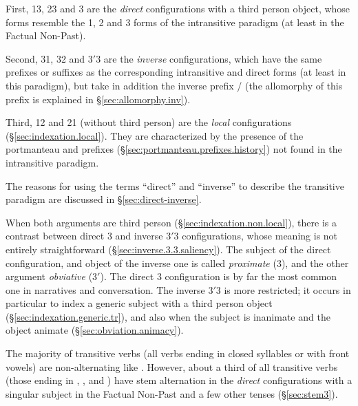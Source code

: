 First, 1\fl{}3, 2\fl{}3 and 3\flobv{} are the \textit{direct} configurations with a third person object, whose forms resemble the 1, 2 and 3 forms of the intransitive paradigm (at least in the Factual Non-Past). 

Second, 3\fl{}1, 3\fl{}2 and 3$'$\fl{}3 are the \textit{inverse} configurations, which have the same prefixes or suffixes as the corresponding intransitive and direct forms (at least in this paradigm), but take in addition the inverse prefix / (the allomorphy of this prefix is explained in §\ref{sec:allomorphy.inv}). 

Third, 1\fl{}2 and 2\fl{}1 (without third person) are the \textit{local} configurations (§\ref{sec:indexation.local}). They are characterized by the presence of the portmanteau  and  prefixes (§\ref{sec:portmanteau.prefixes.history}) not found in the intransitive paradigm.

The reasons for using the terms ``direct'' and ``inverse'' to describe the transitive paradigm are discussed in §\ref{sec:direct-inverse}.

When both arguments are third person (§\ref{sec:indexation.non.local}), there is a contrast between direct  3\flobv{} and inverse 3$'$\fl{}3 configurations, whose meaning is not entirely straightforward  (§\ref{sec:inverse.3.3.saliency}). The subject of the direct configuration, and object of the inverse one is called \textit{proximate} (3), and the other argument \textit{obviative} (3$'$). The direct 3\flobv{} configuration is by far the most common one in narratives and conversation. The inverse 3$'$\fl{}3 is more restricted; it occurs in particular to index a generic subject with a third person object (§\ref{sec:indexation.generic.tr}), and also when the subject is inanimate and the object animate (§\ref{sec:obviation.animacy}).

The majority of transitive verbs (all verbs ending in closed syllables or with front vowels) are non-alternating like . However, about a third of all transitive verbs (those ending in , ,  and ) have stem alternation in the \textit{direct} configurations with a singular subject in the Factual Non-Past and a few other tenses (§\ref{sec:stem3}).
 
